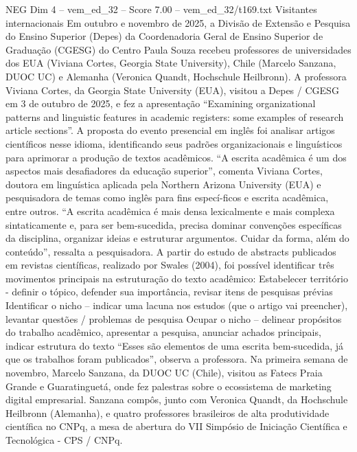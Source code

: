 \begin{textsample}{NEG Dim 4 – vem\_ed\_32 – Score 7.00 – vem\_ed\_32/t169.txt}  \label{ex:f4_neg_140}
Visitantes internacionais Em outubro e novembro de 2025, a Divisão de Extensão e Pesquisa do Ensino Superior (Depes) da Coordenadoria Geral de Ensino Superior de Graduação (CGESG) do Centro Paula Souza recebeu professores de universidades dos EUA (Viviana Cortes, Georgia State University), Chile (Marcelo Sanzana, DUOC UC) e Alemanha (Veronica Quandt, Hochschule Heilbronn).
A professora Viviana Cortes, da Georgia State University (EUA), visitou a Depes / CGESG em 3 de outubro de 2025, e fez a apresentação “Examining organizational patterns and linguistic features in academic registers: some examples of research article sections”.
A proposta do evento presencial em inglês foi analisar artigos científicos nesse idioma, identificando seus padrões organizacionais e linguísticos para aprimorar a produção de textos acadêmicos. “A escrita acadêmica é um dos aspectos mais desafiadores da educação superior”, comenta Viviana Cortes, doutora em linguística aplicada pela Northern Arizona University (EUA) e pesquisadora de temas como inglês para fins especí-ficos e escrita acadêmica, entre outros. “A escrita acadêmica é mais densa lexicalmente e mais complexa sintaticamente e, para ser bem-sucedida, precisa dominar convenções específicas da disciplina, organizar ideias e estruturar argumentos.
Cuidar da forma, além do conteúdo”, ressalta a pesquisadora.
A partir do estudo de abstracts publicados em revistas científicas, realizado por Swales (2004), foi possível identificar três movimentos principais na estruturação do texto acadêmico: Estabelecer território - definir o tópico, defender sua importância, revisar itens de pesquisas prévias Identificar o nicho – indicar uma lacuna nos estudos (que o artigo vai preencher), levantar questões / problemas de pesquisa Ocupar o nicho – delinear propósitos do trabalho acadêmico, apresentar a pesquisa, anunciar achados principais, indicar estrutura do texto “Esses são elementos de uma escrita bem-sucedida, já que os trabalhos foram publicados”, observa a professora.
Na primeira semana de novembro, Marcelo Sanzana, da DUOC UC (Chile), visitou as Fatecs Praia Grande e Guaratinguetá, onde fez palestras sobre o ecossistema de marketing digital empresarial.
Sanzana compôs, junto com Veronica Quandt, da Hochschule Heilbronn (Alemanha), e quatro professores brasileiros de alta produtividade científica no CNPq, a mesa de abertura do VII Simpósio de Iniciação Científica e Tecnológica - CPS / CNPq.

\end{textsample}
